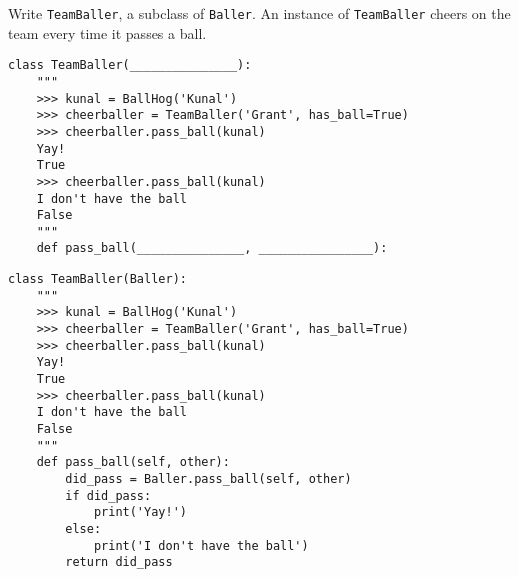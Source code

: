\begin{blocksection}
\question Write \lstinline$TeamBaller$, a subclass of \lstinline$Baller$. An instance of \lstinline$TeamBaller$ cheers on the team every time it passes a ball.

\ifprintanswers\else
\begin{lstlisting}
class TeamBaller(_______________):
    """
    >>> kunal = BallHog('Kunal')
    >>> cheerballer = TeamBaller('Grant', has_ball=True)
    >>> cheerballer.pass_ball(kunal)
    Yay!
    True
    >>> cheerballer.pass_ball(kunal)
    I don't have the ball
    False
    """
    def pass_ball(_______________, ________________):
\end{lstlisting}
\fi

\begin{solution}[1in]
\begin{lstlisting}
class TeamBaller(Baller):
    """
    >>> kunal = BallHog('Kunal')
    >>> cheerballer = TeamBaller('Grant', has_ball=True)
    >>> cheerballer.pass_ball(kunal)
    Yay!
    True
    >>> cheerballer.pass_ball(kunal)
    I don't have the ball
    False
    """
    def pass_ball(self, other):
        did_pass = Baller.pass_ball(self, other)
        if did_pass:
            print('Yay!')
        else:
            print('I don't have the ball')
        return did_pass
\end{lstlisting}
\end{solution}
\end{blocksection}
